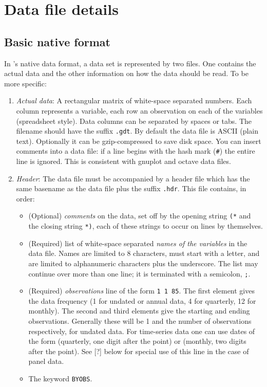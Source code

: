 \chapter{Data file details}
\label{app-datafile}


\section{Basic native format}
\label{native}

In 's native data format, a data set is represented by two
files.  One contains the actual data and the other information on how
the data should be read.  To be more specific:


\begin{enumerate}
\item \emph{Actual data}: A rectangular matrix of white-space
  separated numbers.  Each column represents a variable, each row an
  observation on each of the variables (spreadsheet style). Data
  columns can be separated by spaces or tabs. The filename should have
  the suffix \verb+.gdt+.  By default the data file is ASCII (plain
  text).  Optionally it can be gzip-compressed to save disk space. You
  can insert comments into a data file: if a line begins with the hash
  mark (\verb+#+) the entire line is ignored. This is consistent with
  gnuplot and octave data files.
\item \emph{Header}: The data file must be accompanied by a header
  file which has the same basename as the data file plus the suffix
  \verb+.hdr+.  This file contains, in order:

  \begin{itemize}
  \item (Optional) \emph{comments} on the data, set off by the opening
    string \verb+(*+ and the closing string \verb+*)+, each of these
    strings to occur on lines by themselves.
  \item (Required) list of white-space separated \emph{names of the
      variables} in the data file. Names are limited to 8 characters,
    must start with a letter, and are limited to alphanumeric
    characters plus the underscore.  The list may continue over more
    than one line; it is terminated with a semicolon, \verb+;+.
  \item (Required) \emph{observations} line of the form \verb+1 1 85+.
    The first element gives the data frequency (1 for undated or
    annual data, 4 for quarterly, 12 for monthly).  The second and
    third elements give the starting and ending observations.
    Generally these will be 1 and the number of observations
    respectively, for undated data.  For time-series data one can use
    dates of the form  (quarterly, one digit after the
    point) or  (monthly, two digits after the point). See
    [?] below for special use of this line in the case of panel data.


  \item The keyword \verb+BYOBS+.


  \end{itemize}


\end{enumerate}

